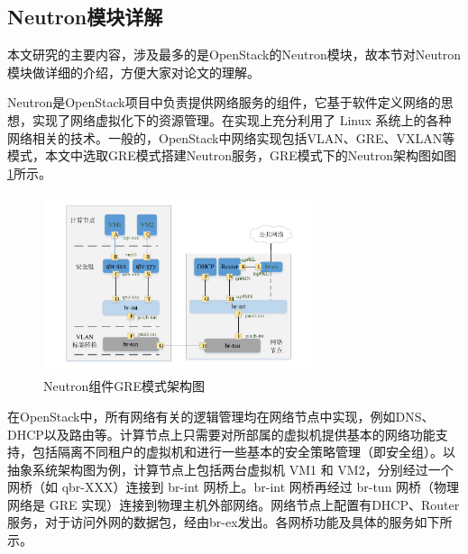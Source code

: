 \subsection{Neutron模块详解}
本文研究的主要内容，涉及最多的是OpenStack的Neutron模块，故本节对Neutron模块做详细的介绍，方便大家对论文的理解。

Neutron是OpenStack项目中负责提供网络服务的组件，它基于软件定义网络的思想，实现了网络虚拟化下的资源管理。在实现上充分利用了 Linux 系统上的各种网络相关的技术。一般的，OpenStack中网络实现包括VLAN、GRE、VXLAN等模式，本文中选取GRE模式搭建Neutron服务，GRE模式下的Neutron架构图如图\ref{fig:neutron}所示。

\begin{figure}[!htb]
  \centering
  \includegraphics[width=0.7\textwidth]{logo/neutron}
  \caption{Neutron组件GRE模式架构图}
  \label{fig:neutron}
\end{figure}

在OpenStack中，所有网络有关的逻辑管理均在网络节点中实现，例如DNS、DHCP以及路由等。计算节点上只需要对所部属的虚拟机提供基本的网络功能支持，包括隔离不同租户的虚拟机和进行一些基本的安全策略管理（即安全组）。以抽象系统架构图为例，计算节点上包括两台虚拟机 VM1 和 VM2，分别经过一个网桥（如 qbr-XXX）连接到 br-int 网桥上。br-int 网桥再经过 br-tun 网桥（物理网络是 GRE 实现）连接到物理主机外部网络。网络节点上配置有DHCP、Router服务，对于访问外网的数据包，经由br-ex发出。各网桥功能及具体的服务如下所示。

